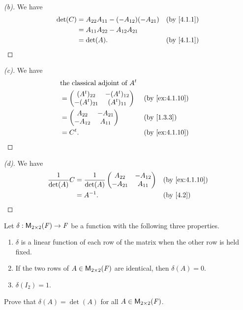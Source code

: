 \begin{proof}[(b)]
  We have
  \begin{align*}
    \det(C) & = A_{2 2} A_{1 1} - (-A_{1 2}) (-A_{2 1}) &  & \by{4.1.1} \\
            & = A_{1 1} A_{2 2} - A_{1 2} A_{2 1}                       \\
            & = \det(A).                                &  & \by{4.1.1}
  \end{align*}
\end{proof}

\begin{proof}[(c)]
  We have
  \begin{align*}
     & \text{the classical adjoint of } \tp{A}                     \\
     & = \begin{pmatrix}
           (\tp{A})_{2 2}  & -(\tp{A})_{1 2} \\
           -(\tp{A})_{2 1} & (\tp{A})_{1 1}
         \end{pmatrix}    &  & \by{ex:4.1.10}                      \\
     & = \begin{pmatrix}
           A_{2 2}  & -A_{2 1} \\
           -A_{1 2} & A_{1 1}
         \end{pmatrix}                  &  & \by{1.3.3}            \\
     & = \tp{C}.                               &  & \by{ex:4.1.10}
  \end{align*}
\end{proof}

\begin{proof}[(d)]
  We have
  \begin{align*}
    \frac{1}{\det(A)} C & = \frac{1}{\det(A)} \begin{pmatrix}
                                                A_{2 2}  & -A_{1 2} \\
                                                -A_{2 1} & A_{1 1}
                                              \end{pmatrix} &  & \by{ex:4.1.10} \\
                        & = A^{-1}.                           &  & \by{4.2}
  \end{align*}
\end{proof}

\begin{ex}\label{ex:4.1.11}
  Let \(\delta : \ms[2][2][\F] \to \F\) be a function with the following three properties.
  \begin{enumerate}
    \item \(\delta\) is a linear function of each row of the matrix when the other row is held fixed.
    \item If the two rows of \(A \in \ms[2][2][\F]\) are identical, then \(\delta(A) = 0\).
    \item \(\delta(I_2) = 1\).
  \end{enumerate}
  Prove that \(\delta(A) = \det(A)\) for all \(A \in \ms[2][2][\F]\).
\end{ex}

